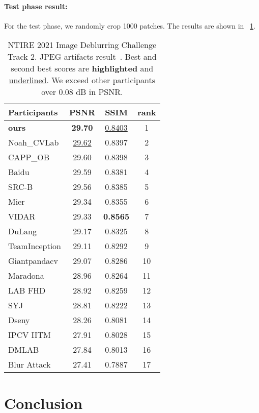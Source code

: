 \documentclass[final]{cvpr}
\newcommand{\tablestyle}[2]{\setlength{\tabcolsep}{#1}\renewcommand{\arraystretch}{#2}\centering\footnotesize}
\begin{document}
\paragraph{Test phase result:}
For the test phase, we randomly crop 1000 patches. The results are shown in ~\ref{result.testphase}.

\begin{table}\centering
\tablestyle{5pt}{1.05}\setlength{\tabcolsep}{1.mm}\begin{tabular}{l|ccc}
Participants & PSNR & SSIM & rank\\
\hline
\textbf{ours} & \textbf{29.70} & \underline{0.8403} & 1\\
Noah\_CVLab & \underline{29.62} & 0.8397 & 2\\
CAPP\_OB & 29.60 & 0.8398 & 3\\
Baidu & 29.59 & 0.8381 & 4\\
SRC-B & 29.56 & 0.8385 & 5\\
Mier & 29.34 & 0.8355 & 6\\
VIDAR & 29.33 & \textbf{0.8565} & 7\\
DuLang & 29.17 & 0.8325 & 8\\
TeamInception & 29.11 & 0.8292 & 9\\
Giantpandacv & 29.07 & 0.8286 & 10\\
Maradona & 28.96 & 0.8264 & 11\\
LAB FHD & 28.92 & 0.8259 & 12\\
SYJ & 28.81 & 0.8222 & 13\\
Dseny & 28.26 & 0.8081 & 14\\
IPCV IITM & 27.91 & 0.8028 & 15\\
DMLAB & 27.84 & 0.8013 & 16\\
Blur Attack & 27.41 & 0.7887 & 17\\
\end{tabular}
\vspace{-0.1cm}
\caption{NTIRE 2021 Image Deblurring Challenge Track 2. JPEG artifacts result~\cite{nah2021ntire}. Best and second best scores are \textbf{highlighted} and \underline{underlined}. We exceed other participants over 0.08 dB in PSNR.}
\label{result.testphase}
\end{table}

\section{Conclusion}
\end{document}
